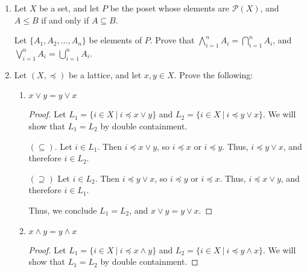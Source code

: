 \documentclass[12pt]{article}
\begin{document}
\begin{enumerate}
\begin{enumerate}
\begin{proof}
Without loss of generality, assume that a poset $P$ has two minimal elements, $a, b$, and one minimum element, $\perp$. By definition of minimum, for all $x \in P$, $\perp \leq x$. Therefore, $\perp \leq a$ and $\perp \leq b$. But by definition of a minimal element, for all $x \in S$ where $S \subseteq P$, $a \leq x$. However, since $\perp \leq x$ for all $x \in P$, it must be that $a = \perp$. The same argument can be applied to $b$, so we have $b = \perp$. Thus, $a = \perp = b$, which means that there can only be one minimal element. 
\end{proof}

\end{enumerate}
(Note: This entire problem could be repeated verbatim for a maximal element as well)

\item Let $X$ be a set, and let $P$ be the poset whose elements are $\mathcal{P}(X)$, and $A\leq B$ if and only if $A\subseteq B$.

Let $\{A_1, A_2, \dots, A_n\}$ be elements of $P$. Prove that $\displaystyle \bigwedge_{i=1}^n A_i = \displaystyle\bigcap_{i=1}^n A_i$, and $\displaystyle \bigvee_{i=1}^n A_i = \displaystyle\bigcup_{i=1}^n A_i$.

\item Let $(X, \preceq)$ be a lattice, and let $x, y\in X$. Prove the following:
\begin{enumerate}
\item $x\vee y = y \vee x$

\begin{proof}
Let $L_1 = \{i \in X\ |\ i \preceq x \vee y\}$ and $L_2 = \{i \in X\ |\ i \preceq y \vee x\}$. We will show that $L_1 = L_2$ by double containment. 

$(\subseteq)$. Let $i \in L_1$. Then $i \preceq x \vee y$, so $i \preceq x$ or $i \preceq y$. Thus, $i \preceq y \vee  x$, and therefore $i \in L_2$. 

$(\supseteq)$ Let $i \in L_2$. Then $i \preceq y \vee x$, so $i \preceq y$ or $i \preceq x$. Thus, $i \preceq x \vee y$, and therefore $i \in L_1$.

Thus, we conclude $L_1 = L_2$, and $x\vee y = y \vee x$. 
\end{proof}

\item $x\wedge y = y\wedge x$

\begin{proof}
Let $L_1 = \{i \in X\ |\ i \preceq x \wedge y\}$ and $L_2 = \{i \in X\ |\ i \preceq y \wedge x\}$. We will show that $L_1 = L_2$ by double containment. 


\end{proof}
\end{enumerate}
\end{enumerate}
\end{document}
